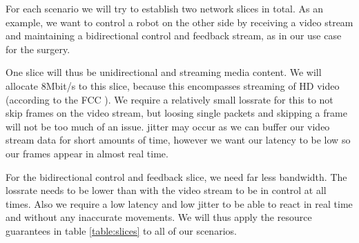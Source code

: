 


For each scenario we will try to establish two network slices in total. As an example, we want to control a robot on the other side by receiving a video stream and maintaining a bidirectional control and feedback stream, as in our use case for the surgery.

One slice will thus be unidirectional and streaming media content. We will allocate 8Mbit/s to this slice, because this encompasses streaming of HD video (according to the FCC \cite{fcc}). We require a relatively small \gls{lossrate} for this to not skip frames on the video stream, but loosing single packets and skipping a frame will not be too much of an issue. \Gls{jitter} may occur as we can buffer our video stream data for short amounts of time, however we want our \gls{latency} to be low so our frames appear in almost real time.

For the bidirectional control and feedback slice, we need far less \gls{bandwidth}. The \gls{lossrate} needs to be lower than with the video stream to be in control at all times. Also we require a low \gls{latency} and low \gls{jitter} to be able to react in real time and without any inaccurate movements. We will thus apply the resource guarantees in table \ref{table:slices} to all of our scenarios.

